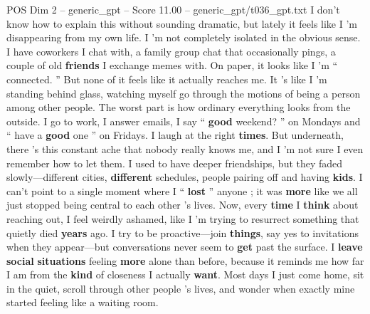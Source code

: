 \begin{textsample}{POS Dim 2 – generic\_gpt – Score 11.00 – generic\_gpt/t036\_gpt.txt}  \label{ex:f2_pos_038}
I don't know how to explain this without sounding dramatic, but lately it feels like I ’m disappearing from my own life.
I ’m not completely isolated in the obvious sense.
I have coworkers I chat with, a family group chat that occasionally pings, a couple of old \textbf{friends} I exchange memes with.
On paper, it looks like I ’m “ connected. ” But none of it feels like it actually reaches me.
It ’s like I ’m standing behind glass, watching myself go through the motions of being a person among other people.
The worst part is how ordinary everything looks from the outside.
I go to work, I answer emails, I say “ \textbf{good} weekend? ” on Mondays and “ have a \textbf{good} one ” on Fridays.
I laugh at the right \textbf{times}.
But underneath, there ’s this constant ache that nobody really knows me, and I ’m not sure I even remember how to let them.
I used to have deeper friendships, but they faded slowly—different cities, \textbf{different} schedules, people pairing off and having \textbf{kids}.
I can't point to a single moment where I “ \textbf{lost} ” anyone ; it was \textbf{more} like we all just stopped being central to each other ’s lives.
Now, every \textbf{time} I \textbf{think} about reaching out, I feel weirdly ashamed, like I ’m trying to resurrect something that quietly died \textbf{years} ago.
I try to be proactive—join \textbf{things}, say yes to invitations when they appear—but conversations never seem to \textbf{get} past the surface.
I \textbf{leave} \textbf{social} \textbf{situations} feeling \textbf{more} alone than before, because it reminds me how far I am from the \textbf{kind} of closeness I actually \textbf{want}.
Most days I just come home, sit in the quiet, scroll through other people ’s lives, and wonder when exactly mine started feeling like a waiting room.

\end{textsample}
